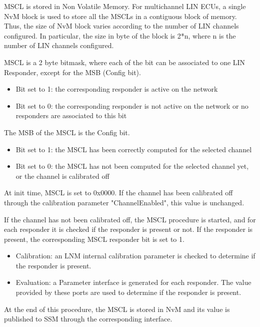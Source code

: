 {
MSCL is stored in Non Volatile Memory. For multichannel LIN ECUs, a single NvM block is used to store all the MSCLs in a contiguous block of memory. Thus, the size of NvM block varies according to the number of LIN
channels configured. In particular, the size in byte of the block is 2*n, where n is the number of LIN channels configured.
}
{  }

{
MSCL is a 2 byte bitmask, where each of the bit can be associated to one LIN Responder, except for the MSB (Config bit). 
\begin{itemize}
    \item Bit set to 1: the corresponding responder is active on the network
	\item Bit set to 0: the corresponding responder is not active on the network or no responders are associated to this bit
\end{itemize}
}
{    }

{
The MSB of the MSCL is the Config bit.
\begin{itemize}
    \item Bit set to 1: the MSCL has been correctly computed for the selected channel
	\item Bit set to 0: the MSCL has not been computed for the selected channel yet, or the channel is calibrated off
\end{itemize}
}
{  }

{
At init time, MSCL is set to 0x0000. If the channel has been calibrated off through the calibration parameter "ChannelEnabled", this value is unchanged.
}
{ }

{
If the channel has not been calibrated off, the MSCL procedure is started, and for each responder it is checked if the responder is present or not. If the responder is present, the corresponding MSCL responder bit is set to 1.
\begin{itemize}
    \item Calibration: an LNM internal calibration parameter is checked to determine if the responder is present.
	\item Evaluation: a Parameter interface is generated for each responder. The value provided by these ports are used to determine if the responder is present. 
\end{itemize}
At the end of this procedure, the MSCL is stored in NvM and its value is published to SSM through the corresponding interface.
}
{   }

